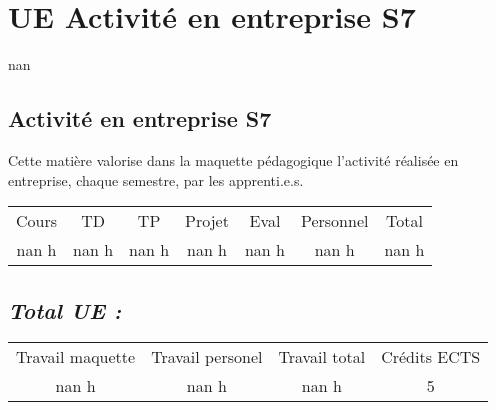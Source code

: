 \section{UE Activité en entreprise S7}%
\label{sec:UEActivitenentrepriseS7}%
nan%
\subsection{Activité en entreprise S7}%
\label{subsec:ActivitenentrepriseS7}%

%
Cette matière valorise dans la maquette pédagogique l'activité réalisée en entreprise, chaque semestre, par les apprenti.e.s.%
\begin{longtable}{c c c c c c c}%
\hline%
Cours&TD&TP&Projet&Eval&Personnel&Total\\%
nan h&nan h&nan h&nan h&nan h&nan h&nan h\\%
\hline%
\end{longtable}%
\subsection{\textit{Total UE :}}%
\label{subsec:textitTotalUE}%

%
\begin{longtable}{c c c c}%
\hline%
Travail maquette&Travail personel&Travail total&Crédits ECTS\\%
nan h&nan h&nan h&5\\%
\hline%
\end{longtable}